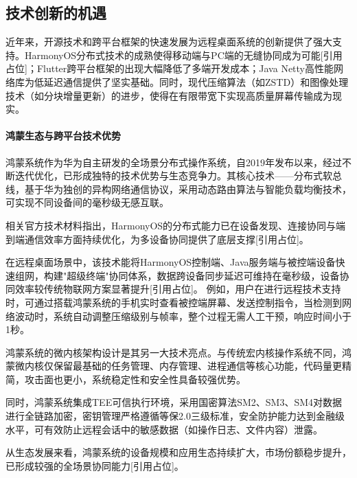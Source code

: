 \documentclass[12pt,a4paper]{article}
\renewcommand{\cite}[1]{[引用占位]}
\begin{document}
\subsection{技术创新的机遇}
近年来，开源技术和跨平台框架的快速发展为远程桌面系统的创新提供了强大支持。HarmonyOS分布式技术的成熟使得移动端与PC端的无缝协同成为可能\cite{huawei2024harmonyosoverview,huawei2025harmonyos50,huawei2025harmonyos51}；Flutter跨平台框架的出现大幅降低了多端开发成本；Java Netty高性能网络库为低延迟通信提供了坚实基础。同时，现代压缩算法（如ZSTD）和图像处理技术（如分块增量更新）的进步，使得在有限带宽下实现高质量屏幕传输成为现实。

\paragraph{鸿蒙生态与跨平台技术优势}

鸿蒙系统作为华为自主研发的全场景分布式操作系统，自2019年发布以来，经过不断迭代优化，已形成独特的技术优势与生态竞争力。其核心技术——分布式软总线，基于华为独创的异构网络通信协议，采用动态路由算法与智能负载均衡技术，可实现不同设备间的毫秒级无感互联。

相关官方技术材料指出，HarmonyOS的分布式能力已在设备发现、连接协同与端到端通信效率方面持续优化，为多设备协同提供了底层支撑\cite{huawei2024harmonyosoverview,huawei2025harmonyos50,huawei2025harmonyos51}。

在远程桌面场景中，该技术能将HarmonyOS控制端、Java服务端与被控端设备快速组网，构建"超级终端"协同体系，数据跨设备同步延迟可维持在毫秒级，设备协同效率较传统物联网方案显著提升\cite{huawei2025harmonyos51,huawei2026freestream}。
例如，用户在进行远程技术支持时，可通过搭载鸿蒙系统的手机实时查看被控端屏幕、发送控制指令，当检测到网络波动时，系统自动调整压缩级别与帧率，整个过程无需人工干预，响应时间小于1秒。

鸿蒙系统的微内核架构设计是其另一大技术亮点。与传统宏内核操作系统不同，鸿蒙微内核仅保留最基础的任务管理、内存管理、进程通信等核心功能，代码量更精简，攻击面也更小，系统稳定性和安全性具备较强优势。

同时，鸿蒙系统集成TEE可信执行环境，采用国密算法SM2、SM3、SM4对数据进行全链路加密，密钥管理严格遵循等保2.0三级标准，安全防护能力达到金融级水平，可有效防止远程会话中的敏感数据（如操作日志、文件内容）泄露。

从生态发展来看，鸿蒙系统的设备规模和应用生态持续扩大，市场份额稳步提升，已形成较强的全场景协同能力\cite{counterpoint2025harmony,huawei2026freestream}。
\end{document}
